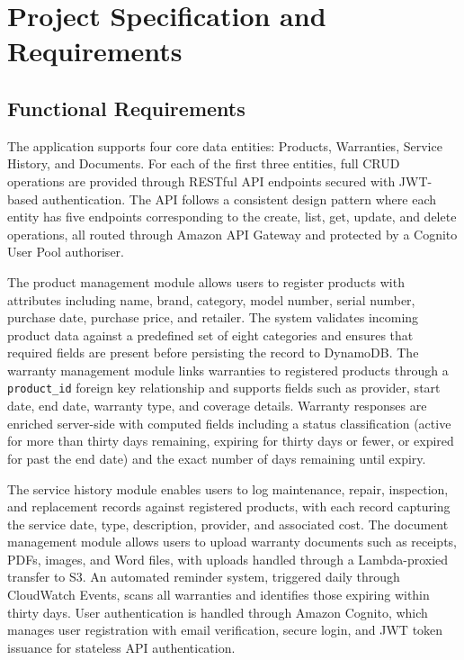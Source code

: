 \documentclass[conference]{IEEEtran}
\begin{document}
\section{Project Specification and Requirements}

\subsection{Functional Requirements}

The application supports four core data entities: Products, Warranties, Service History, and Documents. For each of the first three entities, full CRUD operations are provided through RESTful API endpoints secured with JWT-based authentication. The API follows a consistent design pattern where each entity has five endpoints corresponding to the create, list, get, update, and delete operations, all routed through Amazon API Gateway and protected by a Cognito User Pool authoriser.

The product management module allows users to register products with attributes including name, brand, category, model number, serial number, purchase date, purchase price, and retailer. The system validates incoming product data against a predefined set of eight categories and ensures that required fields are present before persisting the record to DynamoDB. The warranty management module links warranties to registered products through a \texttt{product\_id} foreign key relationship and supports fields such as provider, start date, end date, warranty type, and coverage details. Warranty responses are enriched server-side with computed fields including a status classification (active for more than thirty days remaining, expiring for thirty days or fewer, or expired for past the end date) and the exact number of days remaining until expiry.

The service history module enables users to log maintenance, repair, inspection, and replacement records against registered products, with each record capturing the service date, type, description, provider, and associated cost. The document management module allows users to upload warranty documents such as receipts, PDFs, images, and Word files, with uploads handled through a Lambda-proxied transfer to S3. An automated reminder system, triggered daily through CloudWatch Events, scans all warranties and identifies those expiring within thirty days. User authentication is handled through Amazon Cognito, which manages user registration with email verification, secure login, and JWT token issuance for stateless API authentication.
\end{document}
